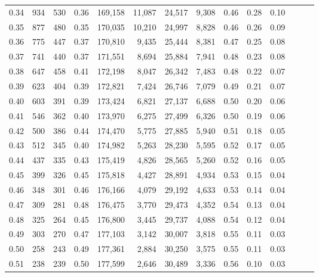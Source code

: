 \begin{tabular}{rrrrrrrrrrrrrr}
0.34 &     934 &    530 &  0.36 &  169,158 &   11,087 &  24,517 &   9,308 &  0.46 &  0.28 &      0.10 \\
0.35 &     877 &    480 &  0.35 &  170,035 &   10,210 &  24,997 &   8,828 &  0.46 &  0.26 &      0.09 \\
0.36 &     775 &    447 &  0.37 &  170,810 &    9,435 &  25,444 &   8,381 &  0.47 &  0.25 &      0.08 \\
0.37 &     741 &    440 &  0.37 &  171,551 &    8,694 &  25,884 &   7,941 &  0.48 &  0.23 &      0.08 \\
0.38 &     647 &    458 &  0.41 &  172,198 &    8,047 &  26,342 &   7,483 &  0.48 &  0.22 &      0.07 \\
0.39 &     623 &    404 &  0.39 &  172,821 &    7,424 &  26,746 &   7,079 &  0.49 &  0.21 &      0.07 \\
0.40 &     603 &    391 &  0.39 &  173,424 &    6,821 &  27,137 &   6,688 &  0.50 &  0.20 &      0.06 \\
0.41 &     546 &    362 &  0.40 &  173,970 &    6,275 &  27,499 &   6,326 &  0.50 &  0.19 &      0.06 \\
0.42 &     500 &    386 &  0.44 &  174,470 &    5,775 &  27,885 &   5,940 &  0.51 &  0.18 &      0.05 \\
0.43 &     512 &    345 &  0.40 &  174,982 &    5,263 &  28,230 &   5,595 &  0.52 &  0.17 &      0.05 \\
0.44 &     437 &    335 &  0.43 &  175,419 &    4,826 &  28,565 &   5,260 &  0.52 &  0.16 &      0.05 \\
0.45 &     399 &    326 &  0.45 &  175,818 &    4,427 &  28,891 &   4,934 &  0.53 &  0.15 &      0.04 \\
0.46 &     348 &    301 &  0.46 &  176,166 &    4,079 &  29,192 &   4,633 &  0.53 &  0.14 &      0.04 \\
0.47 &     309 &    281 &  0.48 &  176,475 &    3,770 &  29,473 &   4,352 &  0.54 &  0.13 &      0.04 \\
0.48 &     325 &    264 &  0.45 &  176,800 &    3,445 &  29,737 &   4,088 &  0.54 &  0.12 &      0.04 \\
0.49 &     303 &    270 &  0.47 &  177,103 &    3,142 &  30,007 &   3,818 &  0.55 &  0.11 &      0.03 \\
0.50 &     258 &    243 &  0.49 &  177,361 &    2,884 &  30,250 &   3,575 &  0.55 &  0.11 &      0.03 \\
0.51 &     238 &    239 &  0.50 &  177,599 &    2,646 &  30,489 &   3,336 &  0.56 &  0.10 &      0.03 \\

\end{tabular}
